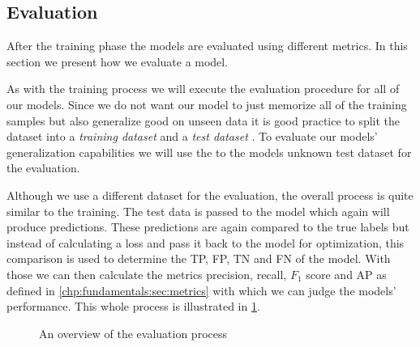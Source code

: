 \subsection{Evaluation}
\label{chp:study:sec:design:subsec:evaluation}
After the training phase the models are evaluated using different metrics.
In this section we present how we evaluate a model.

As with the training process we will execute the evaluation procedure for all of our models.
Since we do not want our model to just memorize all of the training samples but also generalize good on unseen data it is good practice to split the dataset into a \textit{training dataset} and a \textit{test dataset} \parencite{Reitermanova:2010}.
To evaluate our models' generalization capabilities we will use the to the models unknown test dataset for the evaluation.

Although we use a different dataset for the evaluation, the overall process is quite similar to the training.
The test data is passed to the model which again will produce predictions.
These predictions are again compared to the true labels but instead of calculating a loss and pass it back to the model for optimization, this comparison is used to determine the \ac{TP}, \ac{FP}, \ac{TN} and \ac{FN} of the model.
With those we can then calculate the metrics precision, recall, $F_1$ score and \ac{AP} as defined in \cref{chp:fundamentals:sec:metrics} with which we can judge the models' performance.
This whole process is illustrated in \cref{fig:study:design:evaluation}.

\newpage
\begin{figure}[htpb]
    \centering
    \def\svgwidth{\columnwidth}
    
    \caption[Study Design: Evaluation]{An overview of the evaluation process}\label{fig:study:design:evaluation}
\end{figure}
